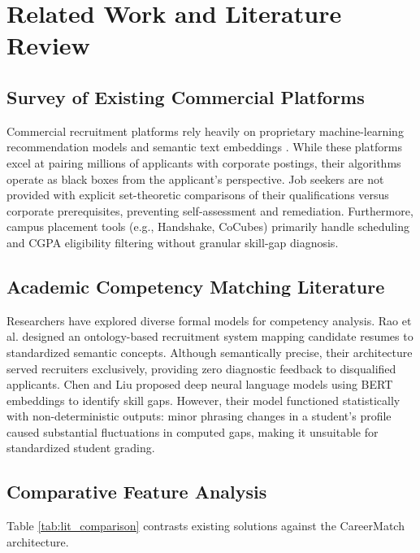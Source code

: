 \documentclass[11pt,a4paper]{report}
\begin{document}
\chapter{Related Work and Literature Review}

\section{Survey of Existing Commercial Platforms}
Commercial recruitment platforms rely heavily on proprietary machine-learning recommendation models and semantic text embeddings \cite{linkedin2019, indeed2021}. While these platforms excel at pairing millions of applicants with corporate postings, their algorithms operate as black boxes from the applicant's perspective. Job seekers are not provided with explicit set-theoretic comparisons of their qualifications versus corporate prerequisites, preventing self-assessment and remediation. Furthermore, campus placement tools (e.g., Handshake, CoCubes) primarily handle scheduling and CGPA eligibility filtering without granular skill-gap diagnosis.

\section{Academic Competency Matching Literature}
Researchers have explored diverse formal models for competency analysis. Rao et al. \cite{rao2020job} designed an ontology-based recruitment system mapping candidate resumes to standardized semantic concepts. Although semantically precise, their architecture served recruiters exclusively, providing zero diagnostic feedback to disqualified applicants. Chen and Liu \cite{chen2022skill} proposed deep neural language models using BERT embeddings to identify skill gaps. However, their model functioned statistically with non-deterministic outputs: minor phrasing changes in a student's profile caused substantial fluctuations in computed gaps, making it unsuitable for standardized student grading.

\section{Comparative Feature Analysis}
Table \ref{tab:lit_comparison} contrasts existing solutions against the CareerMatch architecture.
\end{document}
